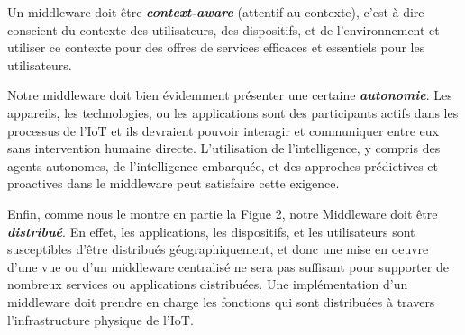 Un middleware doit être \textbf{\textit{context-aware}} (attentif au contexte), c'est-à-dire conscient du contexte des utilisateurs, des dispositifs, et de l’environnement et utiliser ce contexte pour des offres de services efficaces et essentiels pour les utilisateurs.

Notre middleware doit bien évidemment présenter une certaine \textbf{\textit{autonomie}}. Les appareils, les technologies, ou les applications sont des participants actifs dans les processus de l'IoT et ils devraient pouvoir interagir et communiquer entre eux sans intervention humaine directe. L'utilisation de l'intelligence, y compris des agents autonomes, de l’intelligence embarquée, et des approches prédictives et proactives dans le middleware peut satisfaire cette exigence.

Enfin, comme nous le montre en partie la Figue 2, notre Middleware doit être \textbf{\textit{distribué}}. En effet, les applications, les dispositifs, et les utilisateurs sont susceptibles d'être distribués géographiquement, et donc une mise en oeuvre d’une vue ou d’un middleware centralisé ne sera pas suffisant pour supporter de nombreux services ou applications distribuées. Une implémentation d'un middleware doit prendre en charge les fonctions qui sont distribuées à travers l'infrastructure physique de l'IoT.
